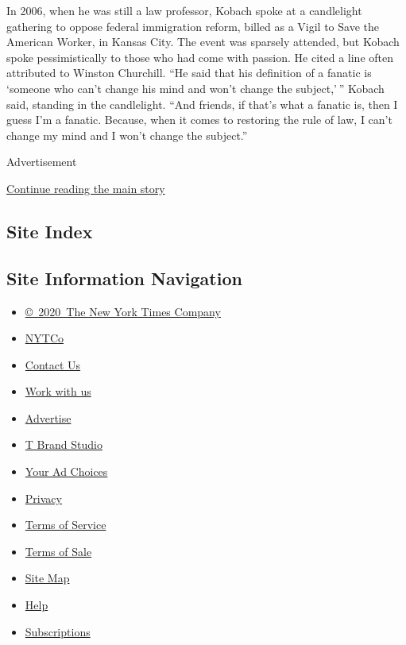 In 2006, when he was still a law professor, Kobach spoke at a
candlelight gathering to oppose federal immigration reform, billed as a
Vigil to Save the American Worker, in Kansas City. The event was
sparsely attended, but Kobach spoke pessimistically to those who had
come with passion. He cited a line often attributed to Winston
Churchill. ``He said that his definition of a fanatic is `someone who
can't change his mind and won't change the subject,' '' Kobach said,
standing in the candlelight. ``And friends, if that's what a fanatic is,
then I guess I'm a fanatic. Because, when it comes to restoring the rule
of law, I can't change my mind and I won't change the subject.''

Advertisement

\protect\hyperlink{after-bottom}{Continue reading the main story}

\hypertarget{site-index}{%
\subsection{Site Index}\label{site-index}}

\hypertarget{site-information-navigation}{%
\subsection{Site Information
Navigation}\label{site-information-navigation}}

\begin{itemize}
\tightlist
\item
  \href{https://help.nytimes.com/hc/en-us/articles/115014792127-Copyright-notice}{©~2020~The
  New York Times Company}
\end{itemize}

\begin{itemize}
\tightlist
\item
  \href{https://www.nytco.com/}{NYTCo}
\item
  \href{https://help.nytimes.com/hc/en-us/articles/115015385887-Contact-Us}{Contact
  Us}
\item
  \href{https://www.nytco.com/careers/}{Work with us}
\item
  \href{https://nytmediakit.com/}{Advertise}
\item
  \href{http://www.tbrandstudio.com/}{T Brand Studio}
\item
  \href{https://www.nytimes.com/privacy/cookie-policy\#how-do-i-manage-trackers}{Your
  Ad Choices}
\item
  \href{https://www.nytimes.com/privacy}{Privacy}
\item
  \href{https://help.nytimes.com/hc/en-us/articles/115014893428-Terms-of-service}{Terms
  of Service}
\item
  \href{https://help.nytimes.com/hc/en-us/articles/115014893968-Terms-of-sale}{Terms
  of Sale}
\item
  \href{https://spiderbites.nytimes.com}{Site Map}
\item
  \href{https://help.nytimes.com/hc/en-us}{Help}
\item
  \href{https://www.nytimes.com/subscription?campaignId=37WXW}{Subscriptions}
\end{itemize}
